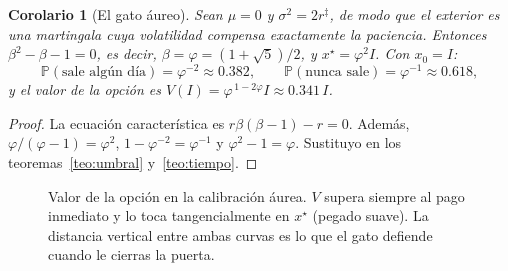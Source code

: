 \documentclass[11pt,a4paper]{article}
\theoremstyle{plain}
\newtheorem{corolario}[teorema]{Corolario}
\theoremstyle{definition}
\theoremstyle{remark}
\numberwithin{equation}{section}
\renewcommand{\P}{\mathbb{P}}
\newcommand{\calib}{{\ensuremath{^{\ddagger}}}}
\begin{document}
\begin{corolario}[El gato áureo]\label{cor:aureo}
Sean $\mu=0$ y $\sigma^2=2r$\calib, de modo que el exterior es una martingala cuya volatilidad compensa exactamente la paciencia. Entonces $\beta^2-\beta-1=0$, es decir, $\beta=\varphi=(1+\sqrt5)/2$, y $x^\star=\varphi^2I$. Con $x_0=I$:
\begin{equation}
  \P(\text{sale algún día})=\varphi^{-2}\approx 0.382,
  \qquad
  \P(\text{nunca sale})=\varphi^{-1}\approx 0.618,
\end{equation}
y el valor de la opción es $V(I)=\varphi^{\,1-2\varphi}I\approx 0.341\,I$.
\end{corolario}

\begin{proof}
La ecuación característica es $r\beta(\beta-1)-r=0$. Además, $\varphi/(\varphi-1)=\varphi^2$, $1-\varphi^{-2}=\varphi^{-1}$ y $\varphi^2-1=\varphi$. Sustituyo en los teoremas~\ref{teo:umbral} y~\ref{teo:tiempo}.
\end{proof}

\begin{figure}[ht]
\centering
{}
\caption{Valor de la opción en la calibración áurea. $V$ supera siempre al pago inmediato y lo toca tangencialmente en $x^\star$ (pegado suave). La distancia vertical entre ambas curvas es lo que el gato defiende cuando le cierras la puerta.}\label{fig:puerta}
\end{figure}
\end{document}
